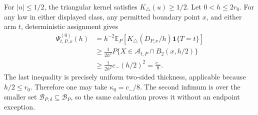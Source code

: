 For \(|u|\leq1/2\), the triangular kernel satisfies \(K_\triangle(u)\geq1/2\).  Let \(0<h\leq2r_0\).  For any law in either displayed class, any permitted boundary point \(x\), and either arm \(t\), deterministic assignment gives
\[
\begin{aligned}
\Psi^{(0)}_{t,P,x}(h)
&=h^{-2}\mathbb E_P\!\left[K_\triangle(D_{P,x}/h)\mathbf 1\{T=t\}\right]\\
&\geq\frac{1}{2h^2}P\{X\in\mathcal A_{t,P}\cap B_2(x,h/2)\}\\
&\geq\frac{1}{2h^2}c_{-}(h/2)^2
=\frac{c_{-}}8.
\end{aligned}
\]
The last inequality is precisely uniform two-sided thickness, applicable because \(h/2\leq r_0\).  Therefore one may take \(\kappa_0=c_{-}/8\).  The second infimum is over the smaller set \(\mathcal B_{P,\delta}\subseteq\mathcal B_P\), so the same calculation proves it without an endpoint exception.